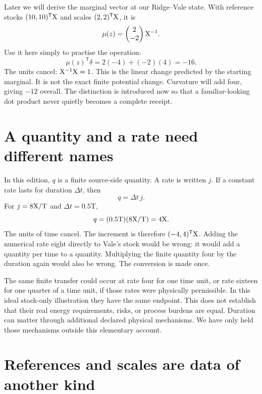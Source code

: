 Later we will derive the marginal vector at our Ridge--Vale state. With reference stocks \((10,10)^{\mathsf T}\mathrm{X}\) and scales \((2,2)^{\mathsf T}\mathrm{X}\), it is
\begin{equation}
\mu(z)=\begin{pmatrix}2\\-2\end{pmatrix}\mathrm{X}^{-1}.
\end{equation}
Use it here simply to practise the operation:
\begin{equation}
\mu(z)^{\mathsf T}\delta=2(-4)+(-2)(4)=-16.
\end{equation}
The units cancel: \(\mathrm{X}^{-1}\mathrm{X}=1\). This is the linear change predicted by the starting marginal. It is not the exact finite potential change. Curvature will add four, giving \(-12\) overall. The distinction is introduced now so that a familiar-looking dot product never quietly becomes a complete receipt.

\section{A quantity and a rate need different names}

In this edition, \(q\) is a finite source-side quantity. A rate is written \(j\). If a constant rate lasts for duration \(\Delta t\), then
\begin{equation}
q=\Delta t\,j.
\end{equation}
For \(j=8\mathrm{X}/\mathrm{T}\) and \(\Delta t=0.5\mathrm{T}\),
\begin{equation}
q=(0.5\mathrm{T})(8\mathrm{X}/\mathrm{T})=4\mathrm{X}.
\end{equation}
The units of time cancel. The increment is therefore \((-4,4)^{\mathsf T}\mathrm{X}\). Adding the numerical rate eight directly to Vale's stock would be wrong: it would add a quantity per time to a quantity. Multiplying the finite quantity four by the duration again would also be wrong. The conversion is made once.

The same finite transfer could occur at rate four for one time unit, or rate sixteen for one quarter of a time unit, if those rates were physically permissible. In this ideal stock-only illustration they have the same endpoint. This does not establish that their real energy requirements, risks, or process burdens are equal. Duration can matter through additional declared physical mechanisms. We have only held those mechanisms outside this elementary account.

\section{References and scales are data of another kind}

